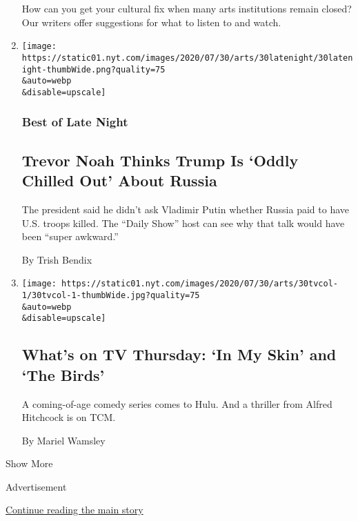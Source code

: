 \begin{enumerate}
  How can you get your cultural fix when many arts institutions remain
  closed? Our writers offer suggestions for what to listen to and watch.
\item
  \href{/2020/07/30/arts/television/trevor-noah-trump-russia.html}{}

  \texttt{[image: https://static01.nyt.com/images/2020/07/30/arts/30latenight/30latenight-thumbWide.png?quality=75\\\&auto=webp\\\&disable=upscale]}

  \hypertarget{best-of-late-night-1}{%
  \subsubsection{Best of Late Night}\label{best-of-late-night-1}}

  \hypertarget{trevor-noah-thinks-trump-is-oddly-chilled-out-about-russia}{%
  \subsection{Trevor Noah Thinks Trump Is `Oddly Chilled Out' About
  Russia}\label{trevor-noah-thinks-trump-is-oddly-chilled-out-about-russia}}

  The president said he didn't ask Vladimir Putin whether Russia paid to
  have U.S. troops killed. The ``Daily Show'' host can see why that talk
  would have been ``super awkward.''

  By Trish Bendix
\item
  \href{/2020/07/30/arts/television/whats-on-tv-thursday-in-my-skin-and-the-birds.html}{}

  \texttt{[image: https://static01.nyt.com/images/2020/07/30/arts/30tvcol-1/30tvcol-1-thumbWide.jpg?quality=75\\\&auto=webp\\\&disable=upscale]}

  \hypertarget{whats-on-tv-thursday-in-my-skin-and-the-birds}{%
  \subsection{What's on TV Thursday: `In My Skin' and `The
  Birds'}\label{whats-on-tv-thursday-in-my-skin-and-the-birds}}

  A coming-of-age comedy series comes to Hulu. And a thriller from
  Alfred Hitchcock is on TCM.

  By Mariel Wamsley
\end{enumerate}

Show More

Advertisement

\protect\hyperlink{after-mid2}{Continue reading the main story}

